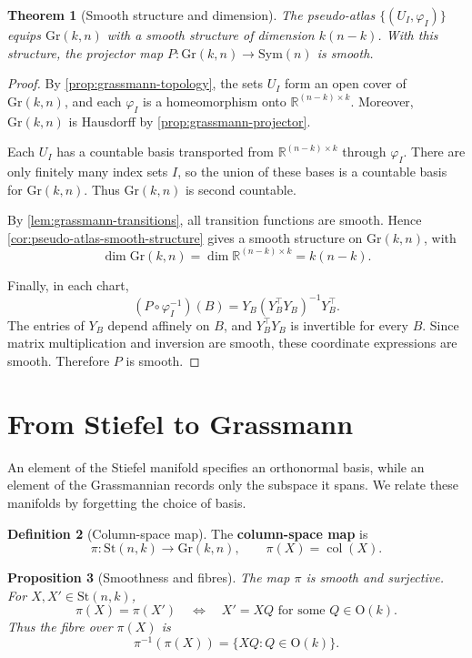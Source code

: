 \documentclass[12pt]{article}
\theoremstyle{definition}
\newtheorem{definition}{Definition}[section]
\theoremstyle{plain}
\newtheorem{proposition}[definition]{Proposition}
\newtheorem{theorem}[definition]{Theorem}
\theoremstyle{remark}
\newcommand{\R}{\mathbb{R}}
\newcommand{\St}{\mathrm{St} (n,k)}
\newcommand{\Gr}{\mathrm{Gr} (k,n)}
\newcommand{\Orth}{\mathrm{O}}               %
\newcommand{\Sym}{\mathrm{Sym}}              %
\DeclareMathOperator{\col}{col}              %
\begin{document}
\begin{theorem}[Smooth structure and dimension]\label{thm:grassmann-manifold}
  The pseudo-atlas \( \{(U_I,\varphi_I)\} \) equips \( \Gr \) with a smooth structure of dimension \( k(n-k) \).
  With this structure, the projector map \( P : \Gr \longrightarrow \Sym(n) \) is smooth.
\end{theorem}

\begin{proof}
  By \cref{prop:grassmann-topology}, the sets \( U_I \) form an open cover of \( \Gr \), and each \( \varphi_I \) is a homeomorphism onto \( \R^{(n-k)\times k} \).
  Moreover, \( \Gr \) is Hausdorff by \cref{prop:grassmann-projector}.

  Each \( U_I \) has a countable basis transported from \( \R^{(n-k)\times k} \) through \( \varphi_I \).
  There are only finitely many index sets \( I \), so the union of these bases is a countable basis for \( \Gr \).
  Thus \( \Gr \) is second countable.

  By \cref{lem:grassmann-transitions}, all transition functions are smooth.
  Hence \cref{cor:pseudo-atlas-smooth-structure} gives a smooth structure on \( \Gr \), with
  \[
    \dim \Gr = \dim \R^{(n-k)\times k} = k(n-k).
  \]

  Finally, in each chart,
  \[
    (P \circ \varphi_I^{-1})(B) = Y_B(Y_B^\top Y_B)^{-1}Y_B^\top.
  \]
  The entries of \( Y_B \) depend affinely on \( B \), and \( Y_B^\top Y_B \) is invertible for every \( B \).
  Since matrix multiplication and inversion are smooth, these coordinate expressions are smooth.
  Therefore \( P \) is smooth.
\end{proof}

\section{From Stiefel to Grassmann}\label{sec:quotient}

An element of the Stiefel manifold specifies an orthonormal basis, while an element of the Grassmannian records only the subspace it spans.
We relate these manifolds by forgetting the choice of basis.

\begin{definition}[Column-space map]\label{def:column-space-map}
  The \textbf{column-space map} is
  \[
    \pi : \St \longrightarrow \Gr, \qquad \pi(X)=\col(X).
  \]
\end{definition}

\begin{proposition}[Smoothness and fibres]\label{prop:column-space-map}
  The map \( \pi \) is smooth and surjective.
  For \( X,X' \in \St \),
  \[
    \pi(X)=\pi(X') \quad\Longleftrightarrow\quad X'=XQ \text{ for some } Q \in \Orth(k).
  \]
  Thus the fibre over \( \pi(X) \) is
  \[
    \pi^{-1}(\pi(X))=\{XQ:Q\in\Orth(k)\}.
  \]
\end{proposition}
\end{document}
